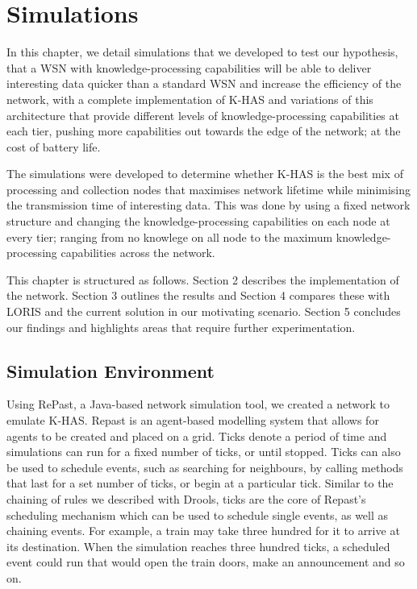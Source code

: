 \chapter{Simulations}
In this chapter, we detail simulations that we developed to test our hypothesis, that a WSN with knowledge-processing capabilities will be able to deliver interesting data quicker than a standard WSN and increase the efficiency of the network, with a complete implementation of K-HAS and variations of this architecture that provide different levels of knowledge-processing capabilities at each tier, pushing more capabilities out towards the edge of the network; at the cost of battery life.

The simulations were developed to determine whether K-HAS is the best mix of processing and collection nodes that maximises network lifetime while minimising the transmission time of interesting data. This was done by using a fixed network structure and changing the knowledge-processing capabilities on each node at every tier; ranging from no knowlege on all node to the maximum knowledge-processing capabilities across the network.

This chapter is structured as follows. Section 2 describes the implementation of the network. Section 3 outlines the results and Section 4 compares these with LORIS and the current solution in our motivating scenario. Section 5 concludes our findings and highlights areas that require further experimentation.

\section{Simulation Environment}

Using RePast, a Java-based network simulation tool, we created a network to emulate K-HAS. Repast is an agent-based modelling system that allows for agents to be created and placed on a grid. Ticks denote a period of time and simulations can run for a fixed number of ticks, or until stopped. Ticks can also be used to schedule events, such as searching for neighbours, by calling methods that last for a set number of ticks, or begin at a particular tick. Similar to the chaining of rules we described with Drools, ticks are the core of Repast's scheduling mechanism which can be used to schedule single events, as well as chaining events. For example, a train may take three hundred for it to arrive at its destination. When the simulation reaches three hundred ticks, a scheduled event could run that would open the train doors, make an announcement and so on.

